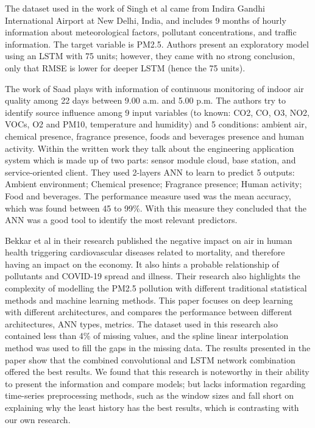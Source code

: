 \documentclass{llncs}
\begin{document}
The dataset used in the work of Singh et al \cite{singh} came from Indira
Gandhi International Airport at New Delhi, India, and includes 9 months
of hourly information about meteorological factors, pollutant
concentrations, and traffic information. The target variable is PM2.5.
Authors present an exploratory model using an LSTM with 75 units;
however, they came with no strong conclusion, only that RMSE is lower
for deeper LSTM (hence the 75 units).

The work of Saad \cite{saad} plays with information of continuous
monitoring of indoor air quality among 22 days between 9.00 a.m. and
5.00 p.m. The authors try to identify source influence among 9 input
variables (to known: CO2, CO, O3, NO2, VOCs, O2 and PM10, temperature
and humidity) and 5 conditions: ambient air, chemical presence,
fragrance presence, foods and beverages presence and human activity.
Within the written work they talk about the engineering application
system which is made up of two parts: sensor module cloud, base station,
and service-oriented client. They used 2-layers ANN to learn to predict 5
outputs: Ambient environment; Chemical presence; Fragrance presence;
Human activity; Food and beverages. The performance measure used was the
mean accuracy, which was found between 45 to 99\%. With this measure
they concluded that the ANN was a good tool to identify the most relevant
predictors.

Bekkar et al \cite{bekkar} in their research published the negative impact on air in
human health triggering cardiovascular diseases related to mortality,
and therefore having an impact on the economy. It also hints a probable
relationship of pollutants and COVID-19 spread and illness. Their
research also highlights the complexity of modelling the PM2.5 pollution
with different traditional statistical methods and machine learning
methods. This paper focuses on deep learning with different
architectures, and compares the performance between different
architectures, ANN types, metrics. The dataset used in this research
also contained less than 4\% of missing values, and the spline linear
interpolation method was used to fill the gaps in the missing data. The
results presented in the paper show that the combined convolutional and
LSTM network combination offered the best results. We found that this
research is noteworthy in their ability to present the information and
compare models; but lacks information regarding time-series
preprocessing methods, such as the window sizes and fall short on
explaining why the least history has the best results, which is
contrasting with our own research.
\end{document}
